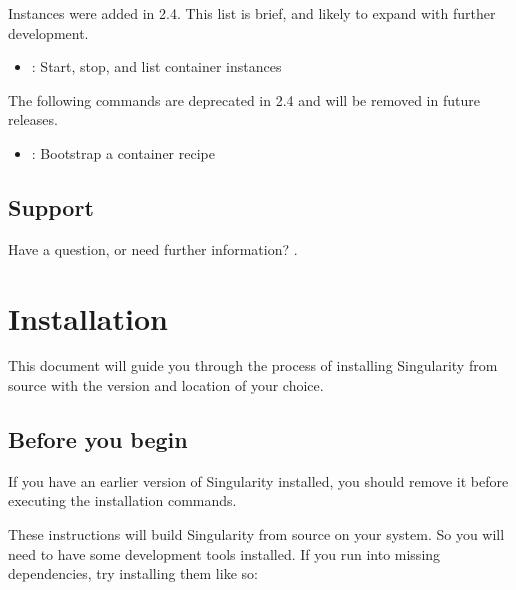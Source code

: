 \documentclass[letterpaper,10pt,english]{sphinxmanual}
\begin{document}
\begin{DUlineblock}{0em}
\item[] 
\item[] Instances were added in 2.4. This list is brief, and likely to expand
with further development.
\end{DUlineblock}
\begin{itemize}
\item {} 
{\hyperref[\detokenize{appendix:instance-command-group}]{}} : Start, stop, and list container instances

\end{itemize}

 The following commands are deprecated in 2.4 and
will be removed in future releases.
\begin{itemize}
\item {} 
{\hyperref[\detokenize{appendix:bootstrap}]{}} : Bootstrap a container recipe

\end{itemize}


\section{Support}
\label{\detokenize{introduction:support}}
Have a question, or need further information? .


\chapter{Installation}
\label{\detokenize{installation:installation}}\label{\detokenize{installation::doc}}\label{\detokenize{installation:sec-installation}}
This document will guide you through the process of installing
Singularity from source with the version and location of your choice.


\section{Before you begin}
\label{\detokenize{installation:before-you-begin}}
If you have an earlier version of Singularity installed, you should
remove it before executing the installation commands.

These instructions will build Singularity from source on your system.
So you will need to have some development tools installed. If you run
into missing dependencies, try installing them like so:
\end{document}
